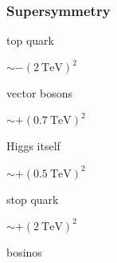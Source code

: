 \begin{frame}
\frametitle{Supersymmetry}

\begin{minipage}[t]{.3\textwidth}
\begin{block}{top quark}
\begin{center}
\vspace{-4.5pt}

\vspace{-4.5pt}

$\sim -(\SI{2}{\TeV})^2$
\end{center}
\end{block}
\end{minipage}
\hfill
\begin{minipage}[t]{.3\textwidth}
\begin{block}{vector bosons}
\begin{center}

\vspace{-9pt}

$\sim +(\SI{0.7}{\TeV})^2$
\end{center}
\end{block}
\end{minipage}
\hfill
\begin{minipage}[t]{.3\textwidth}
\begin{block}{Higgs itself}
\begin{center}

\vspace{-9pt}

$\sim +(\SI{0.5}{\TeV})^2$
\end{center}
\end{block}
\end{minipage}


\begin{minipage}[t]{.3\textwidth}
\begin{block}{stop quark}
\begin{center}

\vspace{-9pt}

$\sim +(\SI{2}{\TeV})^2$
\end{center}
\end{block}
\end{minipage}
\hfill
\begin{minipage}[t]{.3\textwidth}
\begin{block}{bosinos}
\begin{center}
\vspace{-4.5pt}

\vspace{-4.5pt}


\end{center}
\end{block}
\end{minipage}
\end{frame}

